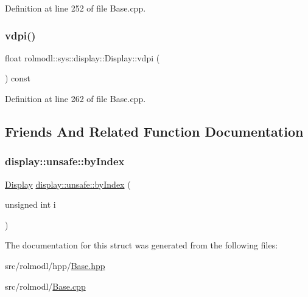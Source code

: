 Definition at line 252 of file Base.\+cpp.

\mbox{\label{structrolmodl_1_1sys_1_1display_1_1_display_a91fdfe8231caad1801caf59b0d15594a}} 
\subsubsection{\texorpdfstring{vdpi()}{vdpi()}}
{\footnotesize\ttfamily float rolmodl\+::sys\+::display\+::\+Display\+::vdpi (\begin{DoxyParamCaption}{ }\end{DoxyParamCaption}) const\hspace{0.3cm}{\ttfamily [noexcept]}}



Definition at line 262 of file Base.\+cpp.



\subsection{Friends And Related Function Documentation}
\mbox{\label{structrolmodl_1_1sys_1_1display_1_1_display_aa210082510dd7ae5227ff2cf1b0fcd77}} 
\subsubsection{\texorpdfstring{display::unsafe::byIndex}{display::unsafe::byIndex}}
{\footnotesize\ttfamily \mbox{\hyperlink{structrolmodl_1_1sys_1_1display_1_1_display}{Display}} \mbox{\hyperlink{namespacerolmodl_1_1sys_1_1display_1_1unsafe_a6821da893c862b8a0f3ac7e8a5a19010}{display\+::unsafe\+::by\+Index}} (\begin{DoxyParamCaption}\item[{unsigned int}]{i }\end{DoxyParamCaption})\hspace{0.3cm}{\ttfamily [friend]}}



The documentation for this struct was generated from the following files\+:\begin{DoxyCompactItemize}
\item 
src/rolmodl/hpp/\mbox{\hyperlink{_base_8hpp}{Base.\+hpp}}\item 
src/rolmodl/\mbox{\hyperlink{_base_8cpp}{Base.\+cpp}}\end{DoxyCompactItemize}
